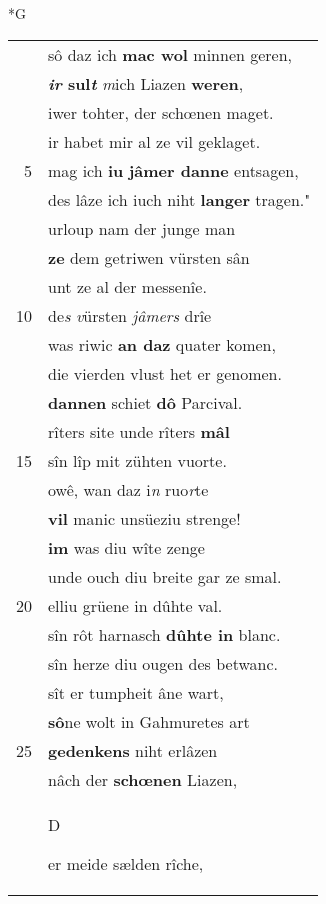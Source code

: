 \documentclass[8pt,a4paper,notitlepage]{article}
\begin{document}
\begin{table}[ht]
\begin{minipage}[t]{0.5\linewidth}
\small
\begin{center}*G
\end{center}
\begin{tabular}{rl}
 & sô daz ich \textbf{mac wol} minnen geren,\\ 
 & \textbf{\textit{ir} sul\textit{t}} \textit{m}ich Liazen \textbf{weren},\\ 
 & iwer tohter, der schœnen maget.\\ 
 & ir habet mir al ze vil geklaget.\\ 
5 & mag ich \textbf{iu} \textbf{jâmer danne} entsagen,\\ 
 & des lâze ich iuch niht \textbf{langer} tragen."\\ 
 & urloup nam der junge man\\ 
 & \textbf{ze} dem getriwen vürsten sân\\ 
 & unt ze al der messenîe.\\ 
10 & de\textit{s} \textit{v}ürsten \textit{jâmers} drîe\\ 
 & was riwic \textbf{an daz} quater komen,\\ 
 & die vierden vlust het er genomen.\\ 
 & \textbf{dannen} schiet \textbf{dô} Parcival.\\ 
 & rîters site unde rîters \textbf{mâl}\\ 
15 & sîn lîp mit zühten vuorte.\\ 
 & owê, wan daz i\textit{n} ruo\textit{r}te\\ 
 & \textbf{vil} manic unsüeziu strenge!\\ 
 & \textbf{im} was diu wîte zenge\\ 
 & unde ouch diu breite gar ze smal.\\ 
20 & elliu grüene in dûhte val.\\ 
 & sîn rôt harnasch \textbf{dûhte in} blanc.\\ 
 & sîn herze diu ougen des betwanc.\\ 
 & sît er tumpheit âne wart,\\ 
 & \textbf{sô}ne wolt in Gahmuretes art\\ 
25 & \textbf{gedenkens} niht erlâzen\\ 
 & nâch der \textbf{schœnen} Liazen,\\ 
 & \begin{large}D\end{large}er meide sælden rîche,\\ 

\end{tabular}
\end{minipage}
\end{table}
\end{document}
